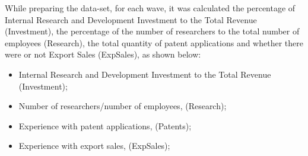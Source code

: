 \documentclass[a4paper,twoside]{article}
\begin{document}
While preparing the data-set, for each wave, it was calculated the percentage of Internal Research and Development Investment to the Total Revenue (Investment), the percentage of the number of researchers to the total number of employees (Research), the total quantity of patent applications and whether there were or not Export Sales (ExpSales), as shown below:

\begin{itemize}
    \item Internal Research and Development Investment to the Total Revenue (Investment);
    \item Number of researchers/number of employees, (Research);
    \item Experience with patent applications, (Patents);
    \item Experience with export sales, (ExpSales);
\end{itemize}
\end{document}
